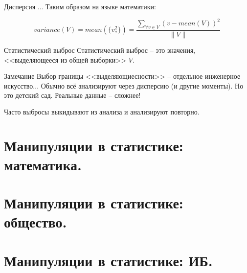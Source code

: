 \begin{frame}{Дисперсия}
	...
	Таким образом на языке математики:
	
	\begin{equation}
	variance(V) = mean(\{v_{*}^2\}) = \frac{\sum_{\forall v \in V} (v-mean(V))^2}{\lVert V \rVert}
	\end{equation}
	
	
\end{frame}

\begin{frame}{Статистический выброс}
	Статистический выброс -- это значения, <<выделяющееся из общей выборки>> $V$.
	
	\begin{block}{Замечание}
	Выбор границы <<выделяющиесности>> -- отдельное инженерное искусство...
	Обычно всё анализируют через дисперсию (и другие моменты). 
	Но это детский сад. Реальные данные -- сложнее!
	\end{block}

	Часто выбросы выкидывают из анализа и анализируют повторно.

\end{frame}


\section{Манипуляции в статистике: математика.}

\begin{frame}
\end{frame}

\section{Манипуляции в статистике: общество.}
  
\section{Манипуляции в статистике: ИБ.}


